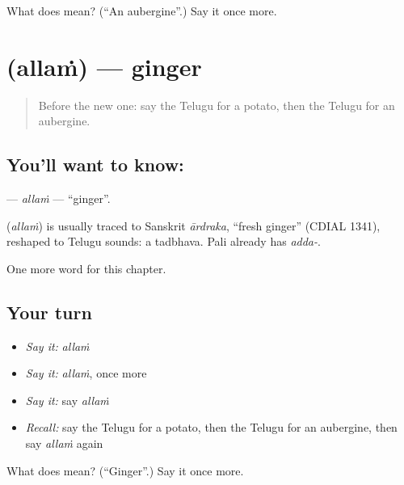 \begin{tcolorbox}[breakable,colback=teal!4,colframe=teal!35!black,title={Before you move on}]
What does  mean? (\textquotedblleft{}An aubergine\textquotedblright{}.) Say it once more.
\end{tcolorbox}
\section[\texorpdfstring{\te{అల్లం} (allaṁ)}{అల్లం (allaṁ)}]{ (allaṁ) — ginger}

\label{lesson:TE-C118-allam}



\begin{quote}
Before the new one: say the Telugu for a potato, then the Telugu for an aubergine.
\end{quote}

\subsection*{You'll want to know: }
\textbf{} — \emph{allaṁ} — \textquotedblleft{}ginger\textquotedblright{}.

\begin{cousinweb}
\textbf{} (\emph{allaṁ}) is usually traced to Sanskrit \emph{ārdraka}, \textquotedblleft{}fresh ginger\textquotedblright{} (CDIAL 1341), reshaped to Telugu sounds: a tadbhava. Pali already has \emph{adda-}.
\end{cousinweb}

\begin{grammarlens}[title={What you've built}]
One more word for this chapter.
\end{grammarlens}

\subsection*{Your turn}
\begin{itemize}
\raggedright
  \item \emph{Say it:} \emph{allaṁ}
  \item \emph{Say it:} \emph{allaṁ}, once more
  \item \emph{Say it:} say \emph{allaṁ}
  \item \emph{Recall:} say the Telugu for a potato, then the Telugu for an aubergine, then say \emph{allaṁ} again
\end{itemize}

\begin{tcolorbox}[breakable,colback=teal!4,colframe=teal!35!black,title={Before you move on}]
What does  mean? (\textquotedblleft{}Ginger\textquotedblright{}.) Say it once more.
\end{tcolorbox}
